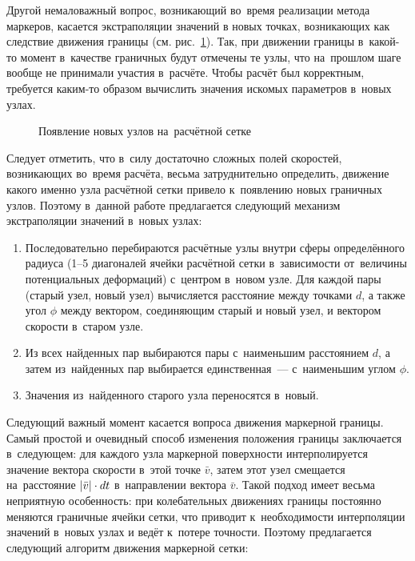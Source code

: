 \documentclass[thesis.tex]{subfiles}
\begin{document}
    Другой немаловажный вопрос, возникающий во~время реализации метода маркеров, касается экстраполяции значений в
    новых точках, возникающих как следствие движения границы (см. рис.~\ref{fig:markers-interpolation}). Так, при
    движении границы в~какой-то момент в~качестве граничных будут отмечены те узлы, что на~прошлом шаге вообще не
    принимали участия в~расчёте. Чтобы расчёт был корректным, требуется каким-то образом вычислить значения искомых
    параметров в~новых узлах.

    \begin{figure}[h!]
        \centering
        \caption{Появление новых узлов на~расчётной сетке}
        \label{fig:markers-interpolation}
    \end{figure}

    Следует отметить, что в~силу достаточно сложных полей скоростей, возникающих во~время расчёта, весьма затруднительно
    определить, движение какого именно узла расчётной сетки привело к~появлению новых граничных узлов. Поэтому в~данной
    работе предлагается следующий механизм экстраполяции значений в~новых узлах:

    \begin{enumerate}
        \item Последовательно перебираются расчётные узлы внутри сферы определённого радиуса (1--5 диагоналей ячейки
              расчётной сетки в~зависимости от~величины потенциальных деформаций) с~центром в~новом узле. Для каждой
              пары (старый узел, новый узел) вычисляется расстояние между точками $d$, а также угол $\phi$ между
              вектором, соединяющим старый и новый узел, и вектором скорости в~старом узле.
        \item Из всех найденных пар выбираются пары с~наименьшим расстоянием $d$, а затем из~найденных пар выбирается
              единственная~--- с~наименьшим углом $\phi$.
        \item Значения из~найденного старого узла переносятся в~новый.
    \end{enumerate}

    Следующий важный момент касается вопроса движения маркерной границы. Самый простой и очевидный способ изменения
    положения границы заключается в~следующем: для каждого узла маркерной поверхности интерполируется значение вектора
    скорости в~этой точке $\bar v$, затем этот узел смещается на~расстояние $\left|\bar v\right| \cdot dt$ в~направлении
    вектора $\bar v$. Такой подход имеет весьма неприятную особенность: при колебательных движениях границы постоянно
    меняются граничные ячейки сетки, что приводит к~необходимости интерполяции значений в~новых узлах и ведёт к~потере
    точности. Поэтому предлагается следующий алгоритм движения маркерной сетки:
\end{document}
